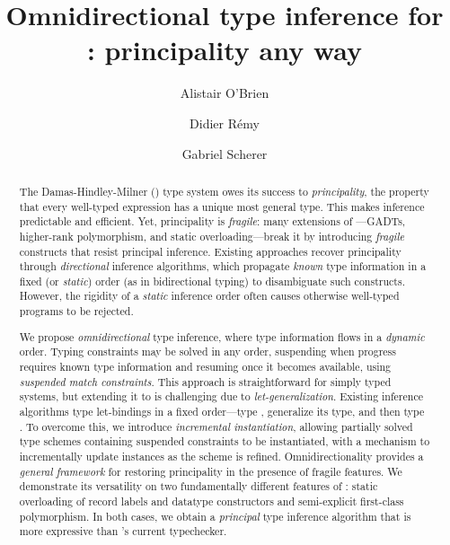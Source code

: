 \documentclass[acmsmall,screen,nonacm%
\Anonymous{,anonymous}{}%
\Final{}{,review}%
]{acmart}
\author{Alistair O'Brien}
\affiliation{
  \institution{University of Cambridge}
  \city{Cambridge}
  \country{United Kingdom}
}
\author{Didier R\'emy}
\affiliation{
  \city{Paris}
  \institution{INRIA}
  \country{France}
}
\author{Gabriel Scherer}
\affiliation{
  \institution{INRIA \& IRIF, Universit\'e Paris Cit\'e}
  \city{Paris}
  \country{France}
}
\title{Omnidirectional type inference for \ML: principality any way}
\providecommand{\DIFadd}[1]{\protect\cbstart{\protect\color{blue}#1}\protect\cbend} %
\providecommand{\DIFdel}[1]{\protect\cbdelete{\protect\color{red}#1}\protect\cbdelete} %
\providecommand{\DIFaddbegin}{} %
\providecommand{\DIFaddend}{} %
\providecommand{\DIFdelbegin}{} %
\providecommand{\DIFdelend}{} %
\begin{document}
\begin{abstract}

  The Damas-Hindley-Milner (\ML) type system owes its success to
  \emph{principality}, the property that every well-typed expression has a
  unique most general type. This makes inference predictable and efficient.
  Yet, principality is \emph{fragile}: many extensions of \ML---GADTs,
  higher-rank polymorphism, and static overloading---break it by introducing
  \emph{fragile} constructs that resist principal inference. Existing
  approaches recover principality through \emph{directional} inference
  algorithms, which propagate \emph{known} type information in a fixed (or
  \emph{static}) order (\eg as in bidirectional typing) to disambiguate such
  constructs. However, the rigidity of a \emph{static} inference order often
  causes otherwise well-typed programs to be rejected.


  We propose \emph{omnidirectional} type inference, where type information
  flows in a \emph{dynamic} order. Typing constraints may be solved in any
  order, suspending when progress requires known type information and resuming
  once it becomes available, using \emph{suspended match constraints}. This
  approach is straightforward for simply typed systems, but extending it to \ML
  is challenging due to \emph{let-generalization}. Existing \ML inference
  algorithms type let-bindings \DIFdelbegin \DIFdel{$\elet \x \ea \eb$ }\DIFdelend in a fixed order---type \DIFdelbegin \DIFdel{$\ea$}\DIFdelend \DIFaddbegin \DIFadd{the let-bound expression 
  first}\DIFaddend , generalize its type, and then type \DIFdelbegin \DIFdel{$\eb$}\DIFdelend \DIFaddbegin \DIFadd{the let-body}\DIFaddend . To overcome this, we
  introduce \emph{incremental instantiation}, allowing partially solved type
  schemes containing suspended constraints to be instantiated, with a mechanism
  to incrementally update instances as the scheme is refined.
  Omnidirectionality provides a \emph{general framework} for restoring
  principality in
  the presence of fragile features. We demonstrate its versatility on two
  fundamentally different features of \OCaml: static overloading of record
  labels and datatype constructors and semi-explicit first-class polymorphism.
  In both cases, we obtain a \emph{principal} type inference algorithm that is
  more expressive than \OCaml's current typechecker.

\end{abstract}
\maketitle
\end{document}
